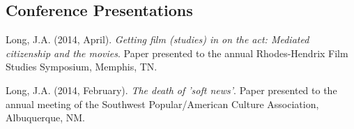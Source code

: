 \documentclass[margin,line]{res}
\begin{document}
\begin{resume}







\section{\sc Conference Presentations}
Long, J.A. (2014, April). \emph{Getting film (studies) in on the act: Mediated citizenship and the movies}. Paper presented to the annual Rhodes-Hendrix Film Studies Symposium, Memphis, TN.

Long, J.A. (2014, February). \emph{The death of 'soft news'}. Paper presented to the annual meeting of the Southwest Popular/American Culture Association, Albuquerque, NM.


\end{resume}
\end{document}
